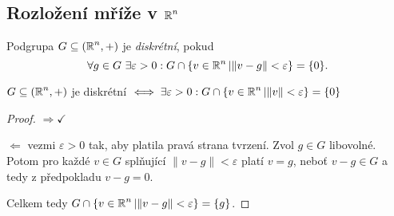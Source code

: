 \subsection{\texorpdfstring{Rozložení mříže v $\operatorname{\mathbb{R}}^n$}{Rozlození mrize v R\^\ n}}

\begin{definition}
Podgrupa $G\subseteq(\operatorname{\mathbb{R}}^n,+)$ je \emph{diskrétní}, pokud $$\forall g\in G\ \exists \varepsilon>0 :  G\cap\{v\in\Real^n|\|v-g\|<\varepsilon\}=\{0\}\text{.}$$
\end{definition}
\begin{observation}
$G\subseteq(\operatorname{\mathbb{R}}^n,+)$ je diskrétní $\iff \exists\varepsilon>0:
G\cap\{v\in\operatorname{\mathbb{R}}^n|\|v\|<\varepsilon\}=\{0\}$
\end{observation}
\begin{proof}
$\Rightarrow \checkmark$

$\Leftarrow$ vezmi $\varepsilon>0$ tak, aby platila pravá strana tvrzení. Zvol $g \in G$ libovolné. Potom pro každé $v\in G$ splňující $\|v-g\|<\varepsilon$ platí $v=g$, neboť $v-g\in G$ a tedy z předpokladu $v-g=0$.

Celkem tedy $G\cap \{v\in\operatorname{\mathbb{R}}^n|\|v-g\|<\varepsilon\}=\{g\}$.
\end{proof}
